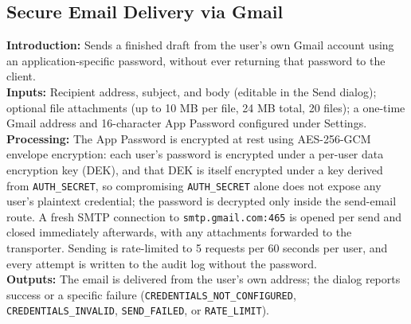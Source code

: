\documentclass[12pt,a4paper]{article}
\begin{document}
\subsection{Secure Email Delivery via Gmail}
\noindent\textbf{Introduction:} Sends a finished draft from the user's own Gmail account using an application-specific password, without ever returning that password to the client.\\
\noindent\textbf{Inputs:} Recipient address, subject, and body (editable in the Send dialog); optional file attachments (up to 10 MB per file, 24 MB total, 20 files); a one-time Gmail address and 16-character App Password configured under Settings.\\
\noindent\textbf{Processing:} The App Password is encrypted at rest using AES-256-GCM envelope encryption: each user's password is encrypted under a per-user data encryption key (DEK), and that DEK is itself encrypted under a key derived from \texttt{AUTH\_SECRET}, so compromising \texttt{AUTH\_SECRET} alone does not expose any user's plaintext credential; the password is decrypted only inside the send-email route. A fresh SMTP connection to \texttt{smtp.gmail.com:465} is opened per send and closed immediately afterwards, with any attachments forwarded to the transporter. Sending is rate-limited to 5 requests per 60 seconds per user, and every attempt is written to the audit log without the password.\\
\noindent\textbf{Outputs:} The email is delivered from the user's own address; the dialog reports success or a specific failure (\texttt{CREDENTIALS\_NOT\_CONFIGURED}, \texttt{CREDENTIALS\_INVALID}, \texttt{SEND\_FAILED}, or \texttt{RATE\_LIMIT}).
\end{document}
